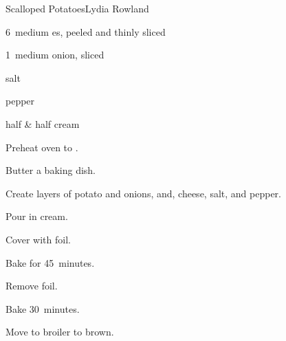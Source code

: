 \begin{recipe}{Scalloped Potatoes}{Lydia Rowland}{}

\begin{ingredients}
\item 6~medium es, peeled and thinly sliced
\item 1~medium onion, sliced
\item {} salt
\item \tp{\quarter} pepper
\item \C{1\half} half \& half cream
\item {}
\end{ingredients}

\begin{directions}
\item Preheat oven to .
\item Butter a baking dish.
\item Create layers of potato and onions, and, cheese, salt, and pepper.
\item Pour in cream.
\item Cover with foil.
\item Bake for 45~minutes.
\item Remove foil.
\item Bake 30~minutes.
\item Move to broiler to brown.
\end{directions}

\end{recipe}
